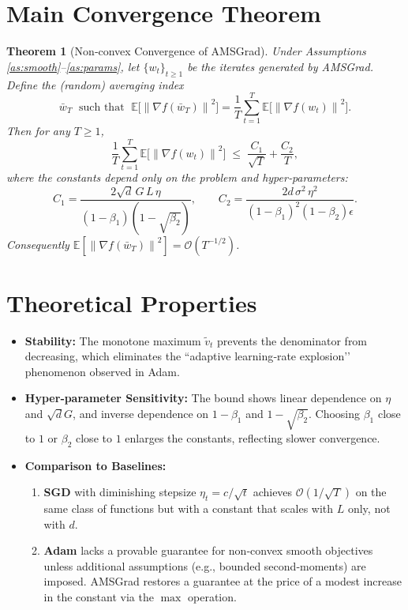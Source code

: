 \documentclass[11pt]{article}
\newtheorem{theorem}{Theorem}
\newcommand{\E}{\mathbb{E}}
\newcommand{\norm}[1]{\left\lVert #1\right\rVert}
\begin{document}
\section*{Main Convergence Theorem}
\begin{theorem}[Non‑convex Convergence of AMSGrad]\label{thm:main}
Under Assumptions \ref{as:smooth}–\ref{as:params}, let $\{w_{t}\}_{t\ge 1}$ be the iterates generated by AMSGrad. Define the (random) averaging index
\[
\bar w_{T}\;\text{ such that }\; \E\!\big[\norm{\nabla f(\bar w_{T})}^{2}\big]
       = \frac{1}{T}\sum_{t=1}^{T}\E\!\big[\norm{\nabla f(w_{t})}^{2}\big].
\]
Then for any $T\ge 1$,
\[
\boxed{\;
\frac{1}{T}\sum_{t=1}^{T}\E\!\big[\norm{\nabla f(w_{t})}^{2}\big]
    \;\le\;
    \frac{C_{1}}{\sqrt{T}}+\frac{C_{2}}{T},
\;}
\]
where the constants depend only on the problem and hyper‑parameters:
\[
C_{1}= \frac{2\sqrt{d}\,G\,L\,\eta}{(1-\beta_{1})(1-\sqrt{\beta_{2}})},
\qquad
C_{2}= \frac{2d\,\sigma^{2}\,\eta^{2}}{(1-\beta_{1})^{2}(1-\beta_{2})\epsilon}.
\]
Consequently $\E[\norm{\nabla f(\bar w_{T})}^{2}]=\mathcal{O}(T^{-1/2})$.
\end{theorem}

\section*{Theoretical Properties}
\begin{itemize}[leftmargin=*]
\item \textbf{Stability:} The monotone maximum $\tilde v_{t}$ prevents the denominator from decreasing, which eliminates the “adaptive learning‑rate explosion’’ phenomenon observed in Adam.
\item \textbf{Hyper‑parameter Sensitivity:} The bound shows linear dependence on $\eta$ and $\sqrt{d}G$, and inverse dependence on $1-\beta_{1}$ and $1-\sqrt{\beta_{2}}$. Choosing $\beta_{1}$ close to $1$ or $\beta_{2}$ close to $1$ enlarges the constants, reflecting slower convergence.
\item \textbf{Comparison to Baselines:}
    \begin{enumerate}
    \item \textbf{SGD} with diminishing stepsize $\eta_{t}=c/\sqrt{t}$ achieves $\mathcal{O}(1/\sqrt{T})$ on the same class of functions but with a constant that scales with $L$ only, not with $d$.
    \item \textbf{Adam} lacks a provable guarantee for non‑convex smooth objectives unless additional assumptions (e.g., bounded second‑moments) are imposed. AMSGrad restores a guarantee at the price of a modest increase in the constant via the $\max$ operation.
    \end{enumerate}
\end{itemize}
\end{document}
